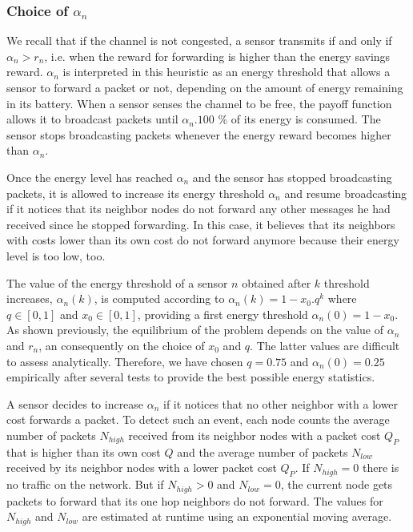 \documentclass[journal, peerreview, onecolumn, draftcls]{IEEEtran}
\begin{document}
\subsubsection{Choice of $\alpha_n$}
We recall that if the channel is not congested, a sensor transmits if and only if $\alpha_n > r_n$, i.e. when the reward for forwarding is higher than the energy savings reward. $\alpha_n$ is interpreted in this heuristic as an energy threshold that allows a sensor to forward a packet or not, depending on the amount of energy remaining in its battery.
When a sensor senses the channel to be free, the payoff function allows it to broadcast packets until $\alpha_n.100$ \% of its energy is consumed. The sensor stops broadcasting packets whenever the energy reward becomes higher than $\alpha_n$.

Once the energy level has reached $\alpha_n$ and the sensor has stopped broadcasting packets, it is allowed to increase its energy threshold $\alpha_n$ and resume broadcasting if it notices that its neighbor nodes do not forward any other messages he had received since he stopped forwarding. In this case, it believes that its neighbors with costs lower than its own cost do not forward anymore because their energy level is too low, too.

The value of the energy threshold of a sensor $n$ obtained after $k$ threshold increases, $\alpha_n(k)$, is computed according to $\alpha_n(k) = 1-x_0.q^{k} $ where $q \in [0,1]$ and $x_0 \in [0,1]$, providing a first energy threshold $\alpha_n(0) = 1-x_0$. As shown previously, the equilibrium of the problem depends on the value of $\alpha_n$ and $r_n$, an consequently on the choice of $x_0$ and $q$. The latter values are difficult to assess analytically. Therefore, we have chosen $q=0.75$ and $\alpha_n(0)=0.25$ empirically after several tests to provide the best possible energy statistics.

A sensor decides to increase $\alpha_n$ if it notices that no other neighbor with a lower cost forwards a packet. To detect such an event, each node counts the average number of packets $N_{high}$ received from its neighbor nodes with a packet cost $Q_P$ that is higher than its own cost $Q$ and the average number of packets $N_{low}$ received by its neighbor nodes with a lower packet cost $Q_P$. If $N_{high}=0$ there is no traffic on the network. But if $N_{high}>0$ and $N_{low}=0$, the current node gets packets to forward that its one hop neighbors do not forward.
The values for $N_{high}$ and $N_{low}$ are estimated at runtime using an exponential moving average.
\end{document}
